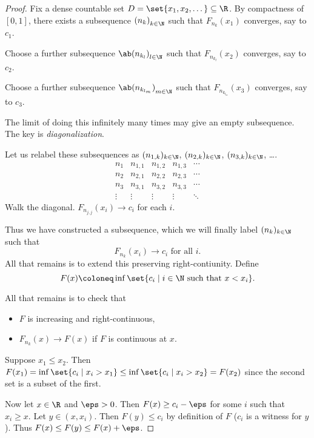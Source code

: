 \begin{proof}
    Fix a dense countable set $D = \set{x_1, x_2, \dots} \subseteq \R$.
    By compactness of $[0, 1]$,
    there exists a subsequence ${(n_k)}_{k \in \N}$ such that
    $F_{n_k}(x_1)$ converges, say to $c_1$.

    Choose a further subsequence ${\ab(n_{k_l})}_{l \in \N}$ such that
    $F_{n_{k_l}}(x_2)$ converges, say to $c_2$.

    Choose a further subsequence ${\ab(n_{k_{l_m}})}_{m \in \N}$ such that
    $F_{n_{k_{l_m}}}(x_3)$ converges, say to $c_3$.

    The limit of doing this infinitely many times may give an empty
    subsequence.
    The key is \emph{diagonalization}.

    Let us relabel these subsequences as
    $(n_{1, k})_{k \in \N}$, $(n_{2, k})_{k \in \N}$,
    $(n_{3, k})_{k \in \N}$, \dots.
    \[
        \begin{array}{c|cccc}
            n_1 & n_{1, 1} & n_{1, 2} & n_{1, 3} & \cdots \\
            n_2 & n_{2, 1} & n_{2, 2} & n_{2, 3} & \cdots \\
            n_3 & n_{3, 1} & n_{3, 2} & n_{3, 3} & \cdots \\
            \vdots & \vdots & \vdots & \vdots & \ddots
        \end{array}
    \] Walk the diagonal.
    $F_{n_{j, j}}(x_i) \to c_i$ for each $i$.

    Thus we have constructed a subsequence, which we will finally
    label $(n_k)_{k \in \N}$ such that \[
        F_{n_k}(x_i) \to c_i \text{ for all } i.
    \] All that remains is to extend this preserving right-contiunity.
    Define \[
        F(x) \coloneq \inf\set{c_i \mid i \in \N
                        \text{ such that } x < x_i}.
    \]

    All that remains is to check that
    \begin{itemize}
        \item $F$ is increasing and right-continuous,
        \item $F_{n_k}(x) \to F(x)$ if $F$ is continuous at $x$.
    \end{itemize}
    Suppose $x_1 \le x_2$.
    Then $F(x_1) = \inf\set{c_i \mid x_i > x_1} \le
    \inf\set{c_i \mid x_i > x_2} = F(x_2)$
    since the second set is a subset of the first.

    Now let $x \in \R$ and $\eps > 0$.
    Then $F(x) \ge c_i - \eps$ for some $i$ such that $x_i \ge x$.
    Let $y \in (x, x_i)$.
    Then $F(y) \le c_i$ by definition of $F$ ($c_i$ is a witness for $y$).
    Thus $F(x) \le F(y) \le F(x) + \eps$.
\end{proof}

